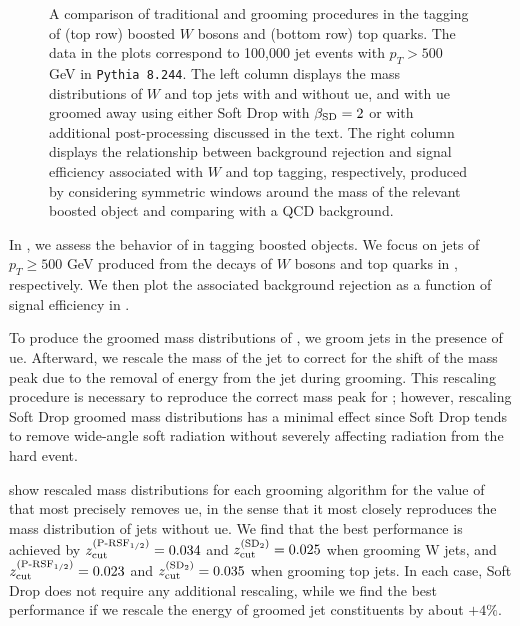 \begin{figure}[p]
{        \label{fig:top_tagging_roc}
    }
    \caption[A comparison of traditional and \PIRANHA{} grooming procedures in the tagging of boosted \(W\) bosons and top quarks.]
    {
         A comparison of traditional and \PIRANHA{} grooming procedures in the tagging of (top row) boosted \(W\) bosons and (bottom row) top quarks.
          The data in the plots correspond to 100,000 jet events with \(p_T > 500\) GeV in \texttt{Pythia 8.244}.
          The left column displays the mass distributions of \(W\) and top jets with and without \gls{ue}, and with \gls{ue} groomed away using either Soft Drop with \(\beta_{\rm SD} = 2\) or  with additional post-processing discussed in the text.
          The right column displays the relationship between background rejection and signal efficiency associated with \(W\) and top tagging, respectively, produced by considering symmetric windows around the mass of the relevant boosted object and comparing with a QCD background.
    }
    \label{fig:tagging}
\end{figure}

   In , we assess the behavior of \PIRANHA{} in tagging boosted objects.
   We focus on jets of \(p_T \geq 500\) GeV produced from the decays of \(W\) bosons and top quarks in , respectively.
   We then plot the associated background rejection as a function of signal efficiency in .

To produce the groomed mass distributions of , we groom jets in the presence of \gls{ue}.
%
 Afterward, we rescale the mass of the jet to correct for the shift of the mass peak due to the removal of energy from the jet during grooming.
   This rescaling procedure is necessary to reproduce the correct mass peak for ;
   however, rescaling Soft Drop groomed mass distributions has a minimal effect since Soft Drop tends to remove wide-angle soft radiation without severely affecting radiation from the hard event.

    show rescaled mass distributions for each grooming algorithm for the value of \zcut{} that most precisely removes \gls{ue}, in the sense that it most closely reproduces the mass distribution of jets without \gls{ue}.
   We find that the best performance is achieved by \(z_{\rm cut}^{(\text{P-RSF}_{1/2})}=0.034\) and \(z_{\rm cut}^{(\text{SD}_2)}=0.025\) when grooming W jets, and \(z_{\rm cut}^{(\text{P-RSF}_{1/2})}=0.023\) and \(z_{\rm cut}^{(\text{SD}_2)}=0.035\) when grooming top jets.
   In each case, Soft Drop does not require any additional rescaling, while we find the best performance if we rescale the energy of  groomed jet constituents by about \(+4\%\).

